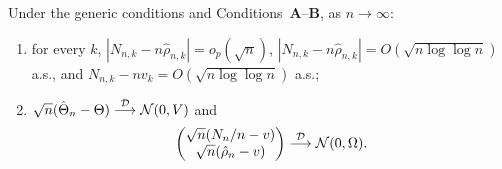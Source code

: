 \begin{theorem}\label{thm:normality}
Under the generic conditions and Conditions~\textbf{A}--\textbf{B}, as
$n\to\infty$:
\begin{enumerate}
  \item[(i)] for every $k$, $|N_{n,k}-n\hat{\rho}_{n,k}|=o_p(\sqrt n)$,
        $|N_{n,k}-n\hat{\rho}_{n,k}|=O(\sqrt{n\log\log n})$ a.s., and
        $N_{n,k}-nv_k=O(\sqrt{n\log\log n})$ a.s.;
  \item[(ii)] $\sqrt n(\hat{\Theta}_n-\Theta)\overset{\mathcal{D}}{\longrightarrow}\mathcal{N}(0,V)$ and
        \[
          \begin{pmatrix}\sqrt n(N_n/n - v)\\ \sqrt n(\hat{\rho}_n - v)\end{pmatrix}
          \overset{\mathcal{D}}{\longrightarrow} \mathcal{N}(0,\Omega).
        \]
\end{enumerate}
\end{theorem}

